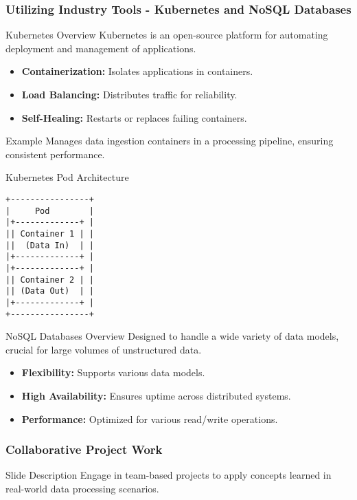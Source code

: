 \documentclass[aspectratio=169]{beamer}
\begin{document}
\begin{frame}[fragile]
    \frametitle{Utilizing Industry Tools - Kubernetes and NoSQL Databases}
    \begin{block}{Kubernetes Overview}
        Kubernetes is an open-source platform for automating deployment and management of applications.
    \end{block}
    \begin{itemize}
        \item \textbf{Containerization:} Isolates applications in containers.
        \item \textbf{Load Balancing:} Distributes traffic for reliability.
        \item \textbf{Self-Healing:} Restarts or replaces failing containers.
    \end{itemize}

    \begin{block}{Example}
        Manages data ingestion containers in a processing pipeline, ensuring consistent performance.
    \end{block}

    \begin{block}{Kubernetes Pod Architecture}
        \begin{lstlisting}
+----------------+
|     Pod        |
|+-------------+ |
|| Container 1 | |
||  (Data In)  | |
|+-------------+ |
|+-------------+ |
|| Container 2 | |
|| (Data Out)  | |
|+-------------+ |
+----------------+
        \end{lstlisting}
    \end{block}

    \begin{block}{NoSQL Databases Overview}
        Designed to handle a wide variety of data models, crucial for large volumes of unstructured data.
    \end{block}
    \begin{itemize}
        \item \textbf{Flexibility:} Supports various data models.
        \item \textbf{High Availability:} Ensures uptime across distributed systems.
        \item \textbf{Performance:} Optimized for various read/write operations.
    \end{itemize}
\end{frame}

\begin{frame}[fragile]
    \frametitle{Collaborative Project Work}
    
    \begin{block}{Slide Description}
        Engage in team-based projects to apply concepts learned in real-world data processing scenarios.
    \end{block}
\end{frame}
\end{document}

